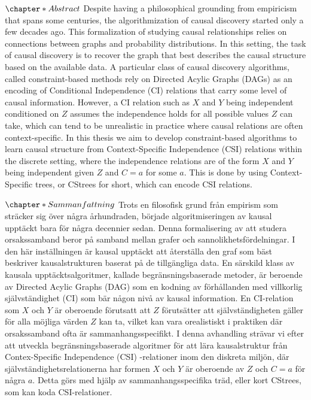 \documentclass{tufte-book}
\author{nazaal}
\date{\today}
\title{}
\begin{document}
\setlength\parindent{0pt}
\setcounter{secnumdepth}{2}
\newcommand{\indep}{\perp \!\!\! \perp}

\let\cleardoublepage\clearpage

\(\chapter*{Abstract}\)
Despite having a philosophical grounding from empiricism that spans some centuries, the algorithmization of causal discovery started only a few decades ago. This formalization of studying causal relationships relies on connections between graphs and probability distributions. In this setting, the task of causal discovery is to recover the graph that best describes the causal structure based on the available data. A particular class of causal discovery algorithms, called constraint-based methods rely on Directed Acylic Graphs (DAGs) as an encoding of Conditional Independence (CI) relations that carry some level of causal information. However, a CI relation such as \(X\) and \(Y\) being independent conditioned on \(Z\) assumes the independence holds for all possible values \(Z\) can take, which can tend to be unrealistic in practice where causal relations are often context-specific.  In this thesis we aim to develop constraint-based algorithms to learn causal structure from Context-Specific Independence (CSI) relations within the discrete setting, where the independence relations are of the form \(X\) and \(Y\) being independent given \(Z\) and \(C=a\) for some \(a\). This is done by using Context-Specific trees, or CStrees for short, which can encode CSI relations. 


\let\cleardoublepage\clearpage

\(\chapter*{Sammanfattning}\)
Trots en filosofisk grund från empirism som sträcker sig över några århundraden, började algoritmiseringen av kausal upptäckt bara för några decennier sedan. Denna formalisering av att studera orsakssamband beror på samband mellan grafer och sannolikhetsfördelningar. I den här inställningen är kausal upptäckt att återställa den graf som bäst beskriver kausalstrukturen baserat på de tillgängliga data. En särskild klass av kausala upptäcktsalgoritmer, kallade begränsningsbaserade metoder, är beroende av Directed Acylic Graphs (DAG) som en kodning av förhållanden med villkorlig självständighet (CI) som bär någon nivå av kausal information. En CI-relation som \(X\) och \(Y\) är oberoende förutsatt att \(Z\) förutsätter att självständigheten gäller för alla möjliga värden \(Z\) kan ta, vilket kan vara orealistiskt i praktiken där orsakssamband ofta är sammanhangsspecifikt. I denna avhandling strävar vi efter att utveckla begränsningsbaserade algoritmer för att lära kausalstruktur från Contex-Specific Independence (CSI) -relationer inom den diskreta miljön, där självständighetsrelationerna har formen \(X\) och \(Y\) är oberoende av \(Z\) och \(C=a\) för några \(a\). Detta görs med hjälp av sammanhangsspecifika träd, eller kort CStrees, som kan koda CSI-relationer.
\end{document}

